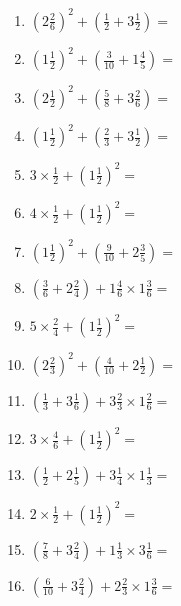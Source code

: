 \documentclass[12pt]{article}
\begin{document}
\begin{enumerate}
\item \large $ (2 \frac{2}{6})^2 + (\frac{1}{2} + 3 \frac{1}{2}) = $ \vspace{1.8cm}
\item \large $ (1 \frac{1}{2})^2 + (\frac{3}{10} + 1 \frac{4}{5}) = $ \vspace{1.8cm}
\item \large $ (2 \frac{1}{2})^2 + (\frac{5}{8} + 3 \frac{2}{6}) = $ \vspace{1.8cm}
\item \large $ (1 \frac{1}{2})^2 + (\frac{2}{3} + 3 \frac{1}{2}) = $ \vspace{1.8cm}
\item \large $ 3 \times \frac{1}{2} + (1 \frac{1}{2})^2 = $ \vspace{1.8cm}
\newpage
\item \large $ 4 \times \frac{1}{2} + (1 \frac{1}{2})^2 = $ \vspace{1.8cm}
\item \large $ (1 \frac{1}{2})^2 + (\frac{9}{10} + 2 \frac{3}{5}) = $ \vspace{1.8cm}
\item \large $ (\frac{3}{6} + 2 \frac{2}{4}) + 1 \frac{4}{6} \times 1 \frac{3}{6} = $ \vspace{1.8cm}
\item \large $ 5 \times \frac{2}{4} + (1 \frac{1}{2})^2 = $ \vspace{1.8cm}
\item \large $ (2 \frac{2}{3})^2 + (\frac{4}{10} + 2 \frac{1}{2}) = $ \vspace{1.8cm}
\item \large $ (\frac{1}{3} + 3 \frac{1}{6}) + 3 \frac{2}{3} \times 1 \frac{2}{6} = $ \vspace{1.8cm}
\item \large $ 3 \times \frac{4}{6} + (1 \frac{1}{2})^2 = $ \vspace{1.8cm}
\item \large $ (\frac{1}{2} + 2 \frac{1}{5}) + 3 \frac{1}{4} \times 1 \frac{1}{3} = $ \vspace{1.8cm}
\item \large $ 2 \times \frac{1}{2} + (1 \frac{1}{2})^2 = $ \vspace{1.8cm}
\item \large $ (\frac{7}{8} + 3 \frac{2}{4}) + 1 \frac{1}{3} \times 3 \frac{1}{6} = $ \vspace{1.8cm}
\newpage
\item \large $ (\frac{6}{10} + 3 \frac{2}{4}) + 2 \frac{2}{3} \times 1 \frac{3}{6} = $ \vspace{1.8cm}

\end{enumerate}
\end{document}

